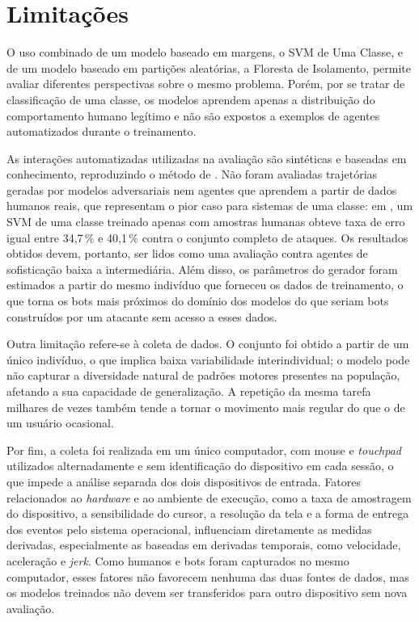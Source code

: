 \section{Limitações}
\label{sec:limitacoes}

O uso combinado de um modelo baseado em margens, o SVM de Uma Classe, e de um modelo baseado em partições aleatórias, a Floresta de Isolamento, permite avaliar diferentes perspectivas sobre o mesmo problema. Porém, por se tratar de classificação de uma classe, os modelos aprendem apenas a distribuição do comportamento humano legítimo e não são expostos a exemplos de agentes automatizados durante o treinamento.

As interações automatizadas utilizadas na avaliação são sintéticas e baseadas em conhecimento, reproduzindo o método de . Não foram avaliadas trajetórias geradas por modelos adversariais nem agentes que aprendem a partir de dados humanos reais, que representam o pior caso para sistemas de uma classe: em , um SVM de uma classe treinado apenas com amostras humanas obteve taxa de erro igual entre 34,7\,\% e 40,1\,\% contra o conjunto completo de ataques. Os resultados obtidos devem, portanto, ser lidos como uma avaliação contra agentes de sofisticação baixa a intermediária. Além disso, os parâmetros do gerador foram estimados a partir do mesmo indivíduo que forneceu os dados de treinamento, o que torna os bots mais próximos do domínio dos modelos do que seriam bots construídos por um atacante sem acesso a esses dados.

Outra limitação refere-se à coleta de dados. O conjunto foi obtido a partir de um único indivíduo, o que implica baixa variabilidade interindividual; o modelo pode não capturar a diversidade natural de padrões motores presentes na população, afetando a sua capacidade de generalização. A repetição da mesma tarefa milhares de vezes também tende a tornar o movimento mais regular do que o de um usuário ocasional.

Por fim, a coleta foi realizada em um único computador, com mouse e \textit{touchpad} utilizados alternadamente e sem identificação do dispositivo em cada sessão, o que impede a análise separada dos dois dispositivos de entrada. Fatores relacionados ao \textit{hardware} e ao ambiente de execução, como a taxa de amostragem do dispositivo, a sensibilidade do cursor, a resolução da tela e a forma de entrega dos eventos pelo sistema operacional, influenciam diretamente as medidas derivadas, especialmente as baseadas em derivadas temporais, como velocidade, aceleração e \textit{jerk}. Como humanos e bots foram capturados no mesmo computador, esses fatores não favorecem nenhuma das duas fontes de dados, mas os modelos treinados não devem ser transferidos para outro dispositivo sem nova avaliação.
